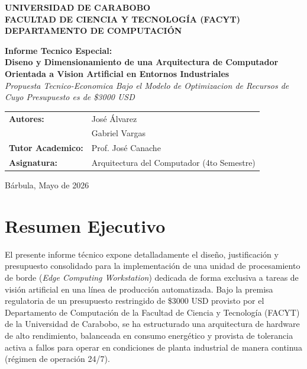 \documentclass[12pt,letterpaper]{article}
\begin{document}
\begin{titlepage}
    \begin{center}
        \large \textbf{UNIVERSIDAD DE CARABOBO} \\
        \large \textbf{FACULTAD DE CIENCIA Y TECNOLOGÍA (FACYT)} \\
        \large \textbf{DEPARTAMENTO DE COMPUTACIÓN} \\
        \vspace{2.5cm}
        
        {\Huge \color{darkblue} \textbf{Informe Tecnico Especial:}} \\
        \vspace{0.4cm}
        {\Huge \color{darkblue} \textbf{Diseno y Dimensionamiento de una Arquitectura de Computador Orientada a Vision Artificial en Entornos Industriales}} \\
        
        \vspace{2.5cm}
        \large \textit{Propuesta Tecnico-Economica Bajo el Modelo de Optimizacion de Recursos de Cuyo Presupuesto es de \$3000 USD} \\
        
        \vspace{3.5cm}
        \begin{table}[h]
            \centering
            \large
            \begin{tabular}{ll}
                \textbf{Autores:} & José Álvarez \\
                                  & Gabriel Vargas \\
                \textbf{Tutor Academico:} & Prof. José Canache \\
                \textbf{Asignatura:} & Arquitectura del Computador (4to Semestre)
            \end{tabular}
        \end{table}
        
        \vfill
        \large Bárbula, Mayo de 2026
    \end{center}
\end{titlepage}

\newpage
\tableofcontents
\newpage

\section{Resumen Ejecutivo}
El presente informe técnico expone detalladamente el diseño, justificación y presupuesto consolidado para la implementación de una unidad de procesamiento de borde (\textit{Edge Computing Workstation}) dedicada de forma exclusiva a tareas de visión artificial en una línea de producción automatizada. Bajo la premisa regulatoria de un presupuesto restringido de \$3000 USD provisto por el Departamento de Computación de la Facultad de Ciencia y Tecnología (FACYT) de la Universidad de Carabobo, se ha estructurado una arquitectura de hardware de alto rendimiento, balanceada en consumo energético y provista de tolerancia activa a fallos para operar en condiciones de planta industrial de manera continua (régimen de operación 24/7).
\end{document}
